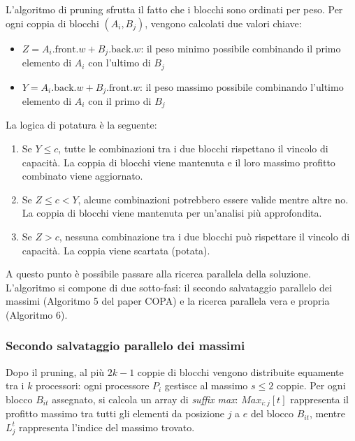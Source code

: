 \documentclass[11pt]{article}
\begin{document}
L'algoritmo di pruning sfrutta il fatto che i blocchi sono ordinati per peso. Per ogni coppia di blocchi $(A_i, B_j)$, vengono calcolati due valori chiave:
\begin{itemize}
    \item $Z = A_i.\text{front}.w + B_j.\text{back}.w$: il peso minimo possibile combinando il primo elemento di $A_i$ con l'ultimo di $B_j$
    \item $Y = A_i.\text{back}.w + B_j.\text{front}.w$: il peso massimo possibile combinando l'ultimo elemento di $A_i$ con il primo di $B_j$
\end{itemize}

La logica di potatura è la seguente:
\begin{enumerate}
    \item Se $Y \leq c$, tutte le combinazioni tra i due blocchi rispettano il vincolo di capacità. La coppia di blocchi viene mantenuta e il loro massimo profitto combinato viene aggiornato.
    \item Se $Z \leq c < Y$, alcune combinazioni potrebbero essere valide mentre altre no. La coppia di blocchi viene mantenuta per un'analisi più approfondita.
    \item Se $Z > c$, nessuna combinazione tra i due blocchi può rispettare il vincolo di capacità. La coppia viene scartata (potata).
\end{enumerate}

A questo punto è possibile passare alla ricerca parallela della soluzione. L'algoritmo si compone di due sotto-fasi: il secondo salvataggio parallelo dei massimi (Algoritmo 5 del paper COPA) e la ricerca parallela vera e propria (Algoritmo 6).

\subsubsection{Secondo salvataggio parallelo dei massimi}
Dopo il pruning, al più $2k-1$ coppie di blocchi vengono distribuite equamente tra i $k$ processori: ogni processore $P_i$ gestisce al massimo $s \leq 2$ coppie. Per ogni blocco $B_{it}$ assegnato, si calcola un array di \textit{suffix max}: $
Max_{i:j}[t]$ rappresenta il profitto massimo tra tutti gli elementi da posizione $j$ a $e$ del blocco $B_{it}$, mentre $L^t_j$ rappresenta l'indice del massimo trovato.
\end{document}
